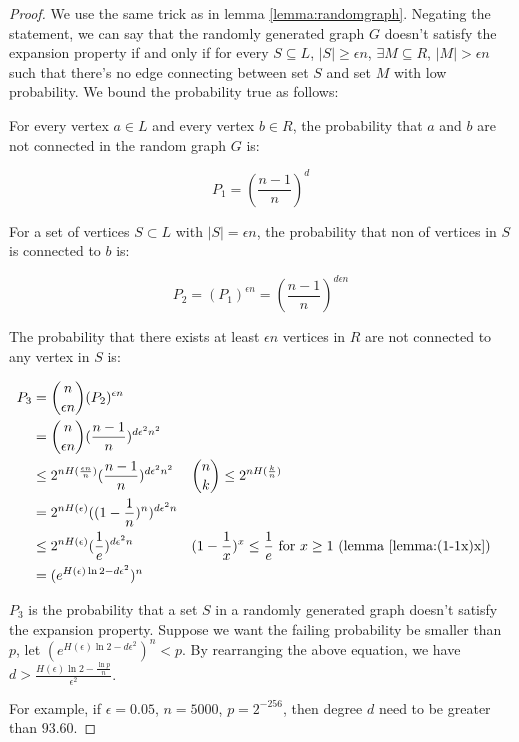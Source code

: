 \begin{proof}

We use the same trick as in lemma \ref{lemma:randomgraph}. Negating the statement, we can say that the randomly generated graph $G$ doesn't satisfy the expansion property if and only if 
for every $ S \subseteq L$, $|S| \ge \epsilon n$, $\exists M \subseteq R$, $|M| > \epsilon n$ such that there's no edge connecting between set $S$ and set $M$ with low probability. 
We bound the probability true as follows:

For every vertex $a \in L$ and every vertex $b \in R$, the probability that $a$ and $b$ are not connected in the random graph $G$ is:

$$P_1 = (\frac{n-1}{n})^{d}$$

For a set of vertices $S \subset L$ with $|S| = \epsilon n$, the probability that non of vertices in $S$ is connected to $b$ is:

$$P_2 = (P_1)^{\epsilon n} = (\frac{n-1}{n})^{d\epsilon n}$$

The probability that there exists at least $\epsilon n$ vertices in $R$ are not connected to any vertex in $S$ is:

\begin{align}
P_3 &= \binom{n}{\epsilon n} (P_2)^{\epsilon n} \nonumber \\
    &= \binom{n}{\epsilon n} (\frac{n-1}{n})^{d \epsilon^2 n^2} \nonumber \\
    &\le 2^{n H(\frac{\epsilon n}{n})} (\frac{n-1}{n})^{d \epsilon^2 n^2} 
    && \binom{n}{k} \le 2^{n H(\frac{k}{n})} \nonumber \\
    &= 2^{n H(\epsilon)} ((1 - \frac{1}{n})^{n})^{d \epsilon^2 n} \nonumber \\
    &\le 2^{n H(\epsilon)} (\frac{1}{e})^{d \epsilon^2 n} 
    && (1 - \frac{1}{x})^x \le \frac{1}{e} \text{ for } x \ge 1 \text{ (lemma \ref{lemma:(1-1x)x})} \nonumber \\
    &= (e^{ H(\epsilon)\ln 2 - d \epsilon^2})^{n} \nonumber \\
\end{align}

$P_3$ is the probability that a set $S$ in a randomly generated graph doesn't satisfy the expansion property. Suppose we want the failing probability be smaller than $p$, let $(e^{ H(\epsilon)\ln 2 - d \epsilon^2})^{n} < p$.
By rearranging the above equation, we have $ d > \frac{H(\epsilon) \ln 2 - \frac{\ln p}{n}}{\epsilon^2}$.

For example, if $\epsilon = 0.05$, $n = 5000$, $p = 2^{-256}$, then degree $d$ need to be greater than $93.60$.


\end{proof}
